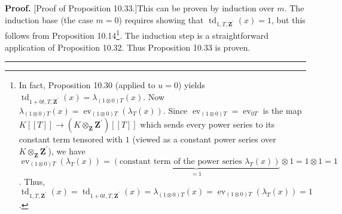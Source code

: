 \documentclass[numbers=enddot,12pt,final,onecolumn,notitlepage]{scrartcl}%
\newenvironment{proof}[1][Proof]{\noindent\textbf{#1.} }{\ \rule{0.5em}{0.5em}}
\begin{document}
\begin{proof}
[Proof of Proposition 10.33.]This can be proven by induction over $m$. The
induction base (the case $m=0$) requires showing that $\operatorname*{td}%
\nolimits_{1,T,\mathbf{Z}^{\prime}}\left(  x\right)  =1$, but this follows
from Proposition 10.14\footnote{In fact, Proposition 10.30 (applied to $u=0$)
yields $\operatorname*{td}\nolimits_{1+0t,T,\mathbf{Z}^{\prime}}\left(
x\right)  =\lambda_{\left(  1\otimes0\right)  T}\left(  x\right)  $. Now
$\lambda_{\left(  1\otimes0\right)  T}\left(  x\right)  =\operatorname*{ev}%
\nolimits_{\left(  1\otimes0\right)  T}\left(  \lambda_{T}\left(  x\right)
\right)  $. Since $\operatorname*{ev}\nolimits_{\left(  1\otimes0\right)
T}=\operatorname*{ev}\nolimits_{0T}$ is the map $K\left[  \left[  T\right]
\right]  \rightarrow\left(  K\otimes_{\mathbf{Z}}\mathbf{Z}^{\prime}\right)
\left[  \left[  T\right]  \right]  $ which sends every power series to its
constant term tensored with $1$ (viewed as a constant power series over
$K\otimes_{\mathbf{Z}}\mathbf{Z}^{\prime}$), we have $\operatorname*{ev}%
\nolimits_{\left(  1\otimes0\right)  T}\left(  \lambda_{T}\left(  x\right)
\right)  =\underbrace{\left(  \text{constant term of the power series }%
\lambda_{T}\left(  x\right)  \right)  }_{=1}\otimes1=1\otimes1=1$. Thus,
$\operatorname*{td}\nolimits_{1,T,\mathbf{Z}^{\prime}}\left(  x\right)
=\operatorname*{td}\nolimits_{1+0t,T,\mathbf{Z}^{\prime}}\left(  x\right)
=\lambda_{\left(  1\otimes0\right)  T}\left(  x\right)  =\operatorname*{ev}%
\nolimits_{\left(  1\otimes0\right)  T}\left(  \lambda_{T}\left(  x\right)
\right)  =1$.}. The induction step is a straightforward application of
Proposition 10.32. Thus Proposition 10.33 is proven.
\end{proof}
\end{document}
